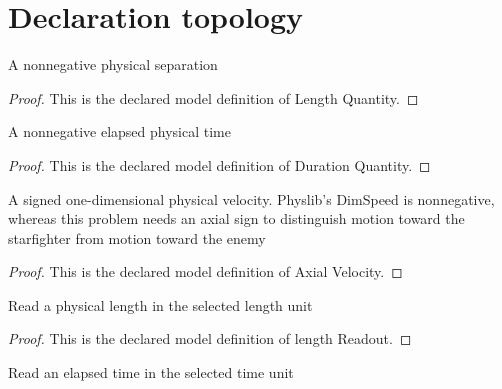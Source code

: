 \section{Declaration topology}
\begin{definition}
  \label{def:physics:phyx-mini-0512:phyxminiproblems-problemphyxmini0512-lengthquantity}
  A nonnegative physical separation
\end{definition}
\begin{proof}
  This is the declared model definition of Length Quantity.
\end{proof}
\begin{definition}
  \label{def:physics:phyx-mini-0512:phyxminiproblems-problemphyxmini0512-durationquantity}
  A nonnegative elapsed physical time
\end{definition}
\begin{proof}
  This is the declared model definition of Duration Quantity.
\end{proof}
\begin{definition}
  \label{def:physics:phyx-mini-0512:phyxminiproblems-problemphyxmini0512-axialvelocity}
  A signed one-dimensional physical velocity. Physlib's DimSpeed is nonnegative, whereas this problem needs an axial sign to distinguish motion toward the starfighter from motion toward the enemy
\end{definition}
\begin{proof}
  This is the declared model definition of Axial Velocity.
\end{proof}
\begin{definition}
  \label{def:physics:phyx-mini-0512:phyxminiproblems-problemphyxmini0512-lengthreadout}
  Read a physical length in the selected length unit
\end{definition}
\begin{proof}
  This is the declared model definition of length Readout.
\end{proof}
\begin{definition}
  \label{def:physics:phyx-mini-0512:phyxminiproblems-problemphyxmini0512-durationreadout}
  Read an elapsed time in the selected time unit
\end{definition}
